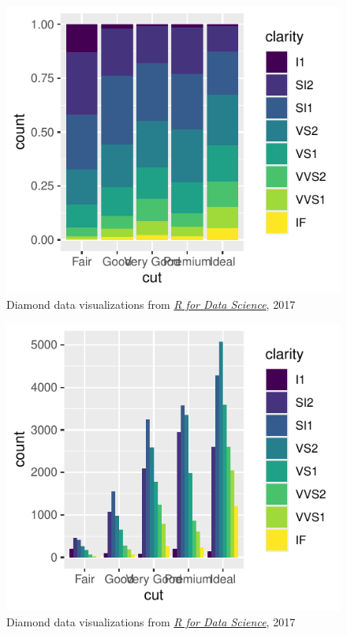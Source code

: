 \documentclass[
  letterpaper,
  DIV=11,
  numbers=noendperiod]{scrreprt}
\begin{document}
\begin{figure}[H]

{\centering \includegraphics{src/03-Effective_Viz_files/figure-pdf/unnamed-chunk-11-4.pdf}

}

\caption{Diamond data visualizations from
\href{http://r4ds.had.co.nz/data-visualisation.html\#position-adjustments}{\emph{R
for Data Science}}, 2017}

\end{figure}%

\begin{figure}[H]

{\centering \includegraphics{src/03-Effective_Viz_files/figure-pdf/unnamed-chunk-11-5.pdf}

}

\caption{Diamond data visualizations from
\href{http://r4ds.had.co.nz/data-visualisation.html\#position-adjustments}{\emph{R
for Data Science}}, 2017}

\end{figure}%
\end{document}
